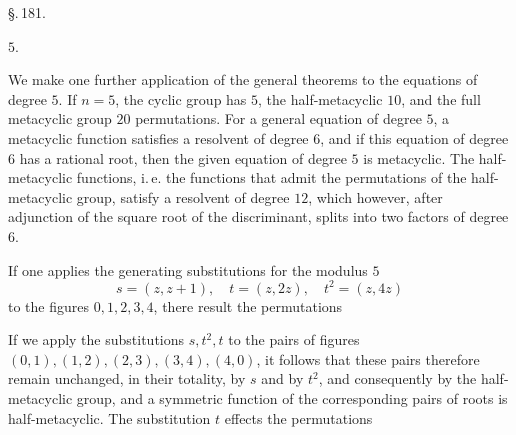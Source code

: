 
\begin{center}
\S.\,181.

 $5$.
\end{center}

\quad We make one further application of the general theorems
to the equations of degree $5$. If $n = 5$, the cyclic
group has $5$, the half-metacyclic $10$, and the full metacyclic
group $20$ permutations. For a general equation of degree $5$, a metacyclic
function satisfies a resolvent of degree $6$,
and if this equation of degree $6$ has a rational
root, then the given equation of degree $5$ is metacyclic.
The half-metacyclic functions, i.\,e. the functions
that admit the permutations of the half-metacyclic group,
satisfy a resolvent of degree $12$, which however, after
adjunction of the square root of the discriminant, splits into two
factors of degree $6$.

\quad If one applies the generating substitutions for the modulus $5$
\[
s = (z, z+1),\quad t = (z, 2z),\quad t^2 = (z, 4z)
\]
to the figures $0, 1, 2, 3, 4$, there result the permutations

\quad If we apply the substitutions $s, t^2, t$ to the pairs of
figures $(0,1), (1,2), (2,3), (3,4), (4,0)$, it follows that
these pairs therefore remain unchanged, in their totality, by $s$ and
by $t^2$, and consequently by the half-metacyclic group,
and a symmetric function of the corresponding
pairs of roots is half-metacyclic. The substitution $t$ effects
the permutations
